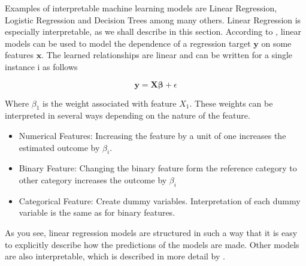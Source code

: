 Examples of interpretable machine learning models are Linear Regression, Logistic Regression and Decision Trees among many others. Linear Regression is especially interpretable, as we shall describe in this section. According to \citet{Molnar:2020:Book}, linear models can be used to model the dependence of a regression target $\boldsymbol{y}$ on some features $\boldsymbol{x}$. The learned relationships are linear and can be written for a single instance i as follows

\begin{equation*}
    \boldsymbol{y} = \boldsymbol{X} \boldsymbol{\beta} + \epsilon
\end{equation*}

Where $\beta_1$ is the weight associated with feature $X_1$. These weights can be interpreted in several ways depending on the nature of the feature.

\begin{itemize}
    \item Numerical Features: Increasing the feature by a unit of one increases the estimated outcome by $\beta_i$.
    \item Binary Feature: Changing the binary feature form the reference category to other category increases the outcome by $\beta_i$
    \item Categorical Feature: Create dummy variables. Interpretation of each dummy variable is the same as for binary features.
\end{itemize}

As you see, linear regression models are structured in such a way that it is easy to explicitly describe how the predictions of the models are made. Other models are also interpretable, which is described in more detail by \citet{Molnar:2020:Book}.